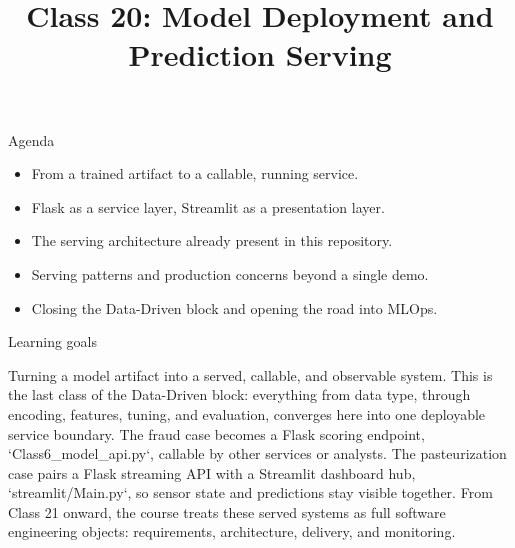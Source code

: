 

\title{Class 20: Model Deployment and Prediction Serving}
\author{\coursename}
\date{}



\frame{\titlepage \coursefooter}

\begin{frame}{Agenda}
\begin{itemize}
\item From a trained artifact to a callable, running service.
\item Flask as a service layer, Streamlit as a presentation layer.
\item The serving architecture already present in this repository.
\item Serving patterns and production concerns beyond a single demo.
\item Closing the Data-Driven block and opening the road into MLOps.
\end{itemize}
\coursefooter
\end{frame}

\begin{frame}{Learning goals}
\coursefooter
\end{frame}

\coursecontextframe
{Turning a model artifact into a served, callable, and observable system.}
{This is the last class of the Data-Driven block: everything from data type, through encoding, features, tuning, and evaluation, converges here into one deployable service boundary.}
{The fraud case becomes a Flask scoring endpoint, `Class6\_model\_api.py`, callable by other services or analysts.}
{The pasteurization case pairs a Flask streaming API with a Streamlit dashboard hub, `streamlit/Main.py`, so sensor state and predictions stay visible together.}
{From Class 21 onward, the course treats these served systems as full software engineering objects: requirements, architecture, delivery, and monitoring.}

